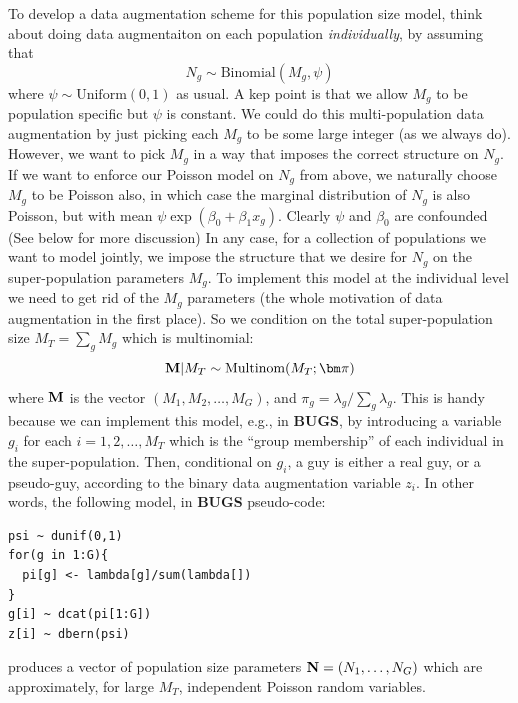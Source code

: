 To develop a data augmentation scheme for this population size model, 
think about doing data augmentaiton on each
population {\it individually}, by assuming that 
\[
 N_{g} \sim \mbox{Binomial}(M_{g} , \psi)
\]
where $\psi \sim \mbox{Uniform}(0,1)$ as usual. 
A kep point is that  
we allow $M_{g}$ to be population specific but
$\psi$ is constant.
We could do this multi-population data augmentation by just picking each $M_{g}$ to
be some large integer (as we always do). However, we want to pick
$M_{g}$ in a way that imposes the correct structure on $N_{g}$. If
we want to enforce our Poisson model on $N_{g}$ from above, we
naturally choose
$M_{g}$ to be Poisson also, in which case the marginal distribution
of $N_{g}$ is also
Poisson, but with mean $\psi \exp(\beta_{0} + \beta_{1}x_{g})$.  Clearly $\psi$ and $\beta_{0}$
are confounded (See below for more discussion)
In any case, for a collection of populations we want to model jointly,
we impose the structure that we desire for $N_{g}$ on the
super-population parameters $M_{g}$.
To implement this model at the individual level we need to get rid
of the $M_{g}$ parameters (the whole motivation of data augmentation in
the first place). So we condition on the total super-population size
$M_{T}= \sum_{g} M_{g}$ which is multinomial:
\begin{equation}
{\bf M}|M_{T} \sim \mbox{Multinom}(M_{T};  {\bm \pi} ) 
\label{eq.mn1}
\end{equation}
where ${\bf M}$ is the vector $(M_{1}, M_{2},\ldots,M_{G})$, and
 $\pi_{g} = \lambda_{g}/\sum_{g} \lambda_{g}$.
This is handy because we can implement this
model, e.g., in {\bf BUGS}, by introducing a variable $g_{i}$ for each $i=1,2,\ldots, M_{T}$
which is the ``group membership'' of each individual in the
super-population.   Then, conditional on $g_{i}$, a guy is either a
real guy, or a pseudo-guy, according to the binary data augmentation
variable $z_{i}$.  In other words, the following model, in {\bf BUGS} pseudo-code:
\begin{verbatim}
psi ~ dunif(0,1)
for(g in 1:G){
  pi[g] <- lambda[g]/sum(lambda[])
}
g[i] ~ dcat(pi[1:G])
z[i] ~ dbern(psi)
\end{verbatim}
produces a vector of population size parameters ${\bf N} = (N_{1},\ldots,N_{G})$
which are approximately, for large $M_{T}$, independent Poisson random variables. 


